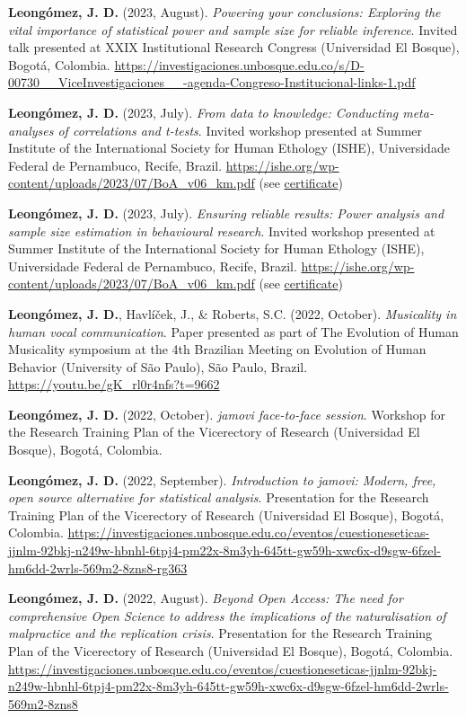 \documentclass[11pt,a4paper,]{awesome-cv}
\begin{document}
\begingroup
\footnotesize
\setlength{\parindent}{-0.5in}
\setlength{\leftskip}{0.5in}

\textbf{Leongómez, J. D.} (2023, August). \emph{Powering your
conclusions: Exploring the vital importance of statistical power and
sample size for reliable inference}. Invited talk presented at XXIX
Institutional Research Congress (Universidad El Bosque), Bogotá,
Colombia.
\url{https://investigaciones.unbosque.edu.co/s/D-00730__ViceInvestigaciones__-agenda-Congreso-Institucional-links-1.pdf}

\textbf{Leongómez, J. D.} (2023, July). \emph{From data to knowledge:
Conducting meta-analyses of correlations and t-tests}. Invited workshop
presented at Summer Institute of the International Society for Human
Ethology (ISHE), Universidade Federal de Pernambuco, Recife, Brazil.
\url{https://ishe.org/wp-content/uploads/2023/07/BoA_v06_km.pdf} (see
\href{https://jdleongomez.info/es/files/Cert_ISHE_2023.pdf}{certificate})

\textbf{Leongómez, J. D.} (2023, July). \emph{Ensuring reliable results:
Power analysis and sample size estimation in behavioural research}.
Invited workshop presented at Summer Institute of the International
Society for Human Ethology (ISHE), Universidade Federal de Pernambuco,
Recife, Brazil.
\url{https://ishe.org/wp-content/uploads/2023/07/BoA_v06_km.pdf} (see
\href{https://jdleongomez.info/es/files/Cert_ISHE_2023.pdf}{certificate})

\textbf{Leongómez, J. D.}, Havlíček, J., \& Roberts, S.C. (2022,
October). \emph{Musicality in human vocal communication}. Paper
presented as part of The Evolution of Human Musicality symposium at the
4th Brazilian Meeting on Evolution of Human Behavior (University of São
Paulo), São Paulo, Brazil. \url{https://youtu.be/gK_rl0r4nfs?t=9662}

\textbf{Leongómez, J. D.} (2022, October). \emph{jamovi face-to-face
session}. Workshop for the Research Training Plan of the Vicerectory of
Research (Universidad El Bosque), Bogotá, Colombia.

\textbf{Leongómez, J. D.} (2022, September). \emph{Introduction to
jamovi: Modern, free, open source alternative for statistical analysis}.
Presentation for the Research Training Plan of the Vicerectory of
Research (Universidad El Bosque), Bogotá, Colombia.
\url{https://investigaciones.unbosque.edu.co/eventos/cuestioneseticas-jjnlm-92bkj-n249w-hbnhl-6tpj4-pm22x-8m3yh-645tt-gw59h-xwc6x-d9sgw-6fzel-hm6dd-2wrls-569m2-8zns8-rg363}

\textbf{Leongómez, J. D.} (2022, August). \emph{Beyond Open Access: The
need for comprehensive Open Science to address the implications of the
naturalisation of malpractice and the replication crisis}. Presentation
for the Research Training Plan of the Vicerectory of Research
(Universidad El Bosque), Bogotá, Colombia.
\url{https://investigaciones.unbosque.edu.co/eventos/cuestioneseticas-jjnlm-92bkj-n249w-hbnhl-6tpj4-pm22x-8m3yh-645tt-gw59h-xwc6x-d9sgw-6fzel-hm6dd-2wrls-569m2-8zns8}
\end{document}

